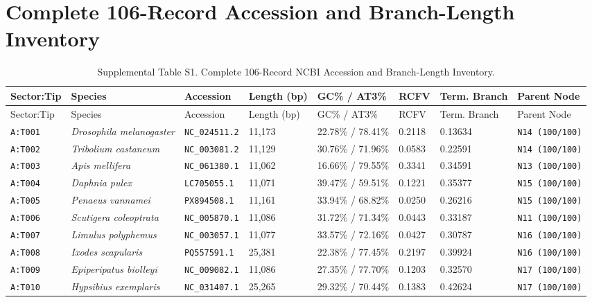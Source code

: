 \documentclass[10pt,letterpaper]{article}
\begin{document}
\section{Complete 106-Record Accession and Branch-Length Inventory}
\footnotesize
\begin{longtable}{llllllll}
\caption{Supplemental Table S1. Complete 106-Record NCBI Accession and Branch-Length Inventory.} \\
\toprule
Sector:Tip & Species & Accession & Length (bp) & GC\% / AT3\% & RCFV & Term. Branch & Parent Node \\
\midrule
\endfirsthead
\toprule
Sector:Tip & Species & Accession & Length (bp) & GC\% / AT3\% & RCFV & Term. Branch & Parent Node \\
\midrule
\endhead
\texttt{A:T001} & \textit{Drosophila melanogaster} & \texttt{NC\_024511.2} & 11,173 & 22.78\% / 78.41\% & 0.2118 & 0.13634 & \texttt{N14 (100/100)} \\
\texttt{A:T002} & \textit{Tribolium castaneum} & \texttt{NC\_003081.2} & 11,129 & 30.76\% / 71.96\% & 0.0583 & 0.22591 & \texttt{N14 (100/100)} \\
\texttt{A:T003} & \textit{Apis mellifera} & \texttt{NC\_061380.1} & 11,062 & 16.66\% / 79.55\% & 0.3341 & 0.34591 & \texttt{N13 (100/100)} \\
\texttt{A:T004} & \textit{Daphnia pulex} & \texttt{LC705055.1} & 11,071 & 39.47\% / 59.51\% & 0.1221 & 0.35377 & \texttt{N15 (100/100)} \\
\texttt{A:T005} & \textit{Penaeus vannamei} & \texttt{PX894508.1} & 11,161 & 33.94\% / 68.82\% & 0.0250 & 0.26216 & \texttt{N15 (100/100)} \\
\texttt{A:T006} & \textit{Scutigera coleoptrata} & \texttt{NC\_005870.1} & 11,086 & 31.72\% / 71.34\% & 0.0443 & 0.33187 & \texttt{N11 (100/100)} \\
\texttt{A:T007} & \textit{Limulus polyphemus} & \texttt{NC\_003057.1} & 11,077 & 33.57\% / 72.16\% & 0.0427 & 0.30787 & \texttt{N16 (100/100)} \\
\texttt{A:T008} & \textit{Ixodes scapularis} & \texttt{PQ557591.1} & 25,381 & 22.38\% / 77.45\% & 0.2197 & 0.39924 & \texttt{N16 (100/100)} \\
\texttt{A:T009} & \textit{Epiperipatus biolleyi} & \texttt{NC\_009082.1} & 11,086 & 27.35\% / 77.70\% & 0.1203 & 0.32570 & \texttt{N17 (100/100)} \\
\texttt{A:T010} & \textit{Hypsibius exemplaris} & \texttt{NC\_031407.1} & 25,265 & 29.32\% / 70.44\% & 0.1383 & 0.42624 & \texttt{N17 (100/100)} \\

\end{longtable}
\end{document}
